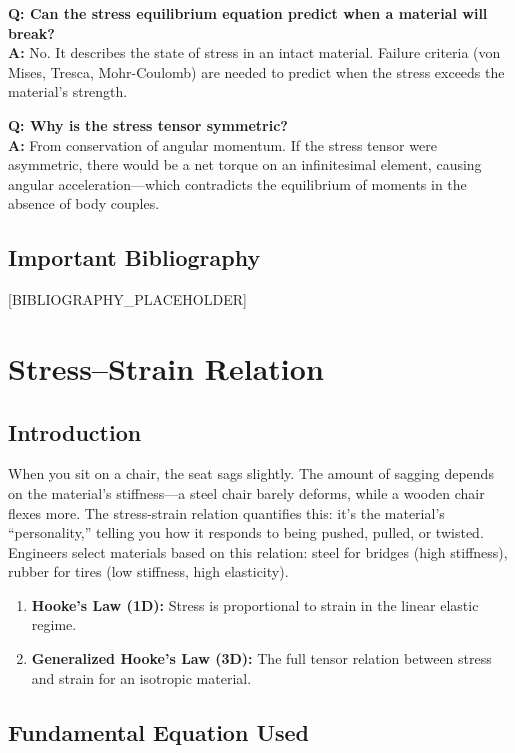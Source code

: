 \documentclass[11pt,openright]{book}
\begin{document}
\textbf{Q: Can the stress equilibrium equation predict when a material will break?}\\
\textbf{A:} No. It describes the state of stress in an intact material. Failure criteria (von Mises, Tresca, Mohr-Coulomb) are needed to predict when the stress exceeds the material's strength.

\textbf{Q: Why is the stress tensor symmetric?}\\
\textbf{A:} From conservation of angular momentum. If the stress tensor were asymmetric, there would be a net torque on an infinitesimal element, causing angular acceleration---which contradicts the equilibrium of moments in the absence of body couples.
\section*{Important Bibliography}

[BIBLIOGRAPHY_PLACEHOLDER]


\chapter{Stress--Strain Relation}

\section*{Introduction}

When you sit on a chair, the seat sags slightly. The amount of sagging depends on the material's stiffness---a steel chair barely deforms, while a wooden chair flexes more. The stress-strain relation quantifies this: it's the material's ``personality,'' telling you how it responds to being pushed, pulled, or twisted. Engineers select materials based on this relation: steel for bridges (high stiffness), rubber for tires (low stiffness, high elasticity).

\begin{enumerate}
\item \textbf{Hooke's Law (1D):} Stress is proportional to strain in the linear elastic regime.

\item \textbf{Generalized Hooke's Law (3D):} The full tensor relation between stress and strain for an isotropic material.

\end{enumerate}
\section*{Fundamental Equation Used}
\end{document}
